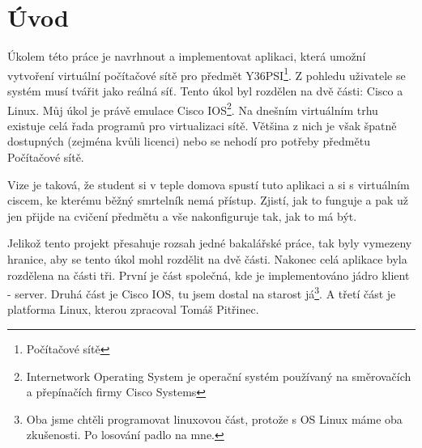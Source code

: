 \chapter{Úvod} \label{uvod}


Úkolem této práce je navrhnout a implementovat aplikaci, která umožní vytvoření virtuální počítačové sítě pro předmět Y36PSI\footnote{Počítačové sítě}. Z pohledu uživatele se systém musí tvářit jako reálná síť. Tento úkol byl rozdělen na dvě části: Cisco a Linux. Můj úkol je právě emulace Cisco IOS\footnote{Internetwork Operating System je operační systém používaný na směrovačích a přepínačích firmy Cisco Systems}. Na dnešním virtuálním trhu existuje celá řada programů pro virtualizaci sítě. Většina z nich je však špatně dostupných (zejména kvůli licenci) nebo se nehodí pro potřeby předmětu Počítačové sítě. 

Vize je taková, že student si v teple domova spustí tuto aplikaci a  si s virtuálním ciscem, ke kterému běžný smrtelník nemá přístup. Zjistí, jak to funguje a pak už jen přijde na cvičení předmětu a vše nakonfiguruje tak, jak to má být. 

Jelikož tento projekt přesahuje rozsah jedné bakalářské práce, tak byly vymezeny hranice, aby se tento úkol mohl rozdělit na dvě části. Nakonec celá aplikace byla rozdělena na části tři. První je část společná, kde je implementováno jádro klient - server. Druhá část je Cisco IOS, tu jsem dostal na starost já\footnote{Oba jsme chtěli programovat linuxovou část, protože s OS Linux máme oba zkušenosti. Po losování  padlo na mne.}. A třetí část je platforma Linux, kterou zpracoval Tomáš Pitřinec.
